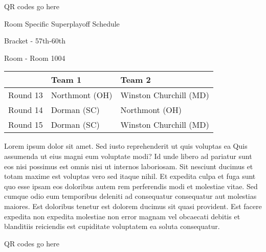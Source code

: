 \documentclass{article}%
\begin{document}
\vspace*{140pt}%
\begin{center}%
\begin{Huge}%
QR codes go here%
\end{Huge}%
\end{center}%
\newpage%
\begin{center}%
\begin{Huge}%
Room Specific Superplayoff Schedule%
\end{Huge}%
\vspace*{8pt}%
\linebreak%
\begin{Large}%
Bracket {-} 57th{-}60th%
\end{Large}%
\vspace*{8pt}%
\linebreak%
\vspace*{8pt}%
\begin{Large}%
Room {-} Room 1004%
\end{Large}%
\end{center}%
%
\begin{tabularx}{\textwidth}{|c|Y|Y|}%
\hline%
&Team 1&Team 2\\%
\hline%
Round 13&Northmont (OH)&Winston Churchill (MD)\\%
Round 14&Dorman (SC)&Northmont (OH)\\%
Round 15&Dorman (SC)&Winston Churchill (MD)\\%
\hline%
\end{tabularx}%
\vspace*{8pt}%
\newline%
Lorem ipsum dolor sit amet. Sed iusto reprehenderit ut quis voluptas ea Quis assumenda ut eius magni eum voluptate modi? Id unde libero ad pariatur sunt eos nisi possimus est omnis nisi ut internos laboriosam. Sit nesciunt ducimus et totam maxime est voluptas vero sed itaque nihil. Et expedita culpa et fuga sunt quo esse ipsam eos doloribus autem rem perferendis modi et molestiae vitae.\newline%
\newline%
Sed cumque odio eum temporibus deleniti ad consequatur consequatur aut molestias maiores. Est doloribus tenetur est dolorem ducimus sit quasi provident. Est facere expedita non expedita molestiae non error magnam vel obcaecati debitis et blanditiis reiciendis est cupiditate voluptatem ea soluta consequatur.%
\vspace*{140pt}%
\begin{center}%
\begin{Huge}%
QR codes go here%
\end{Huge}%
\end{center}%
\end{document}
